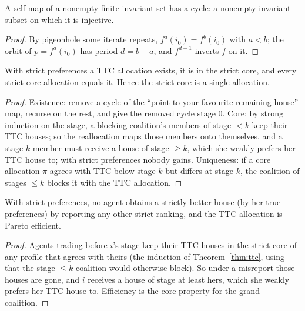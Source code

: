 \begin{lemma}[Cycles]
\label{lem:exists-cycle}
\leanok
A self-map of a nonempty finite invariant set has a cycle: a nonempty invariant subset on which it is injective.
\end{lemma}
\begin{proof}
\leanok
By pigeonhole some iterate repeats, $f^a(i_0) = f^b(i_0)$ with $a < b$; the orbit of $p = f^a(i_0)$ has period
$d = b - a$, and $f^{d-1}$ inverts $f$ on it.
\end{proof}

\begin{theorem}
\label{thm:ttc}
\leanok
{}
With strict preferences a TTC allocation exists, it is in the strict core, and every strict-core allocation equals
it. Hence the strict core is a single allocation.
\end{theorem}
\begin{proof}
\leanok
Existence: remove a cycle of the ``point to your favourite remaining house'' map, recurse on the rest, and give the
removed cycle stage $0$. Core: by strong induction on the stage, a blocking coalition's members of stage $<k$ keep
their TTC houses; so the reallocation maps those members onto themselves, and a stage-$k$ member must receive a house
of stage $\ge k$, which she weakly prefers her TTC house to; with strict preferences nobody gains. Uniqueness: if a
core allocation $\pi$ agrees with TTC below stage $k$ but differs at stage $k$, the coalition of stages $\le k$ blocks
it with the TTC allocation.
\end{proof}

\begin{theorem}
\label{thm:ttc-strategyproof}
\leanok
{}
With strict preferences, no agent obtains a strictly better house (by her true preferences) by reporting any other
strict ranking, and the TTC allocation is Pareto efficient.
\end{theorem}
\begin{proof}
\leanok
Agents trading before $i$'s stage keep their TTC houses in the strict core of any profile that agrees with theirs
(the induction of Theorem~\ref{thm:ttc}, using that the stage-$\le k$ coalition would otherwise block). So under a
misreport those houses are gone, and $i$ receives a house of stage at least hers, which she weakly prefers her TTC
house to. Efficiency is the core property for the grand coalition.
\end{proof}


